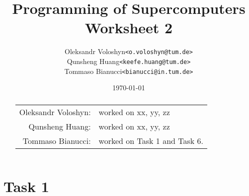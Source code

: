 \documentclass{article}
\title{Programming of Supercomputers\\Worksheet 2}
\author{
	\begin{tabular}{rl}
		Oleksandr Voloshyn& \texttt{<o.voloshyn@tum.de>}\\ 
		Qunsheng Huang& \texttt{<keefe.huang@tum.de>}\\ 
		Tommaso Bianucci& \texttt{<bianucci@in.tum.de>}
	\end{tabular}
}
\date{\today}
\begin{document}
\maketitle
\renewcommand{\abstractname}{Group members's contributions}
\begin{abstract}
	\begin{center}
		\begin{tabular}{rl}
		Oleksandr Voloshyn:& worked on xx, yy, zz\\
		Qunsheng Huang:& worked on xx, yy, zz\\
		Tommaso Bianucci:& worked on Task 1 and Task 6.
		\end{tabular}
	\end{center}
\end{abstract}

\section{Task 1}
\end{document}
